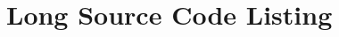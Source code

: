 \documentclass[english,bachelor]{diploma}
\begin{document}
\MakeTitlePages





%
%
%


\printbibliography[heading=bibintoc]

\appendix
%
%


\chapter{Long Source Code Listing}
%
\end{document}
